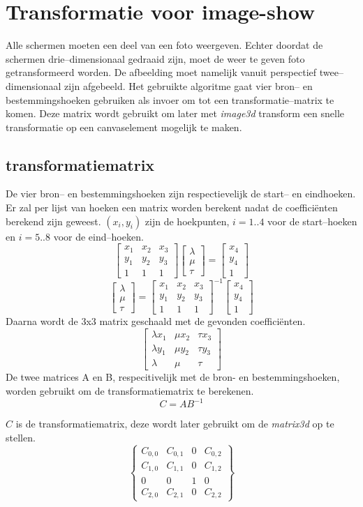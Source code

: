 \section{Transformatie voor image-show}
Alle schermen moeten een deel van een foto weergeven. Echter doordat de schermen drie--dimensionaal gedraaid zijn, moet de weer te geven foto getransformeerd worden. De afbeelding moet namelijk vanuit perspectief twee--dimensionaal zijn afgebeeld. Het gebruikte algoritme gaat vier bron-- en bestemmingshoeken gebruiken als invoer om tot een transformatie--matrix te komen. Deze matrix wordt gebruikt om later met {\it image3d} transform een snelle transformatie op een canvaselement mogelijk te maken.

\subsection{transformatiematrix}
De vier bron-- en bestemmingshoeken zijn respectievelijk de start-- en eindhoeken. Er zal per lijst van hoeken een matrix worden berekent nadat de coefficiënten berekend zijn geweest. $(x_i, y_i)$ zijn de hoekpunten, $i = 1..4$ voor de start--hoeken en $i = 5..8$ voor de eind--hoeken. \cite{redrawImageFrom3dPerspectiveTo2d}
$$ \begin{bmatrix}
x_1 & x_2 & x_3 \\ y_1 & y_2 & y_3 \\ 1 & 1 & 1
\end{bmatrix} \begin{bmatrix}
\lambda \\ \mu \\ \tau
\end{bmatrix} =
\begin{bmatrix}
x_4 \\ y_4 \\ 1
\end{bmatrix}
$$
$$ \begin{bmatrix}
\lambda \\ \mu \\ \tau
\end{bmatrix} =\begin{bmatrix}
x_1 & x_2 & x_3 \\ y_1 & y_2 & y_3 \\ 1 & 1 & 1
\end{bmatrix}^{-1}
\begin{bmatrix}
x_4 \\ y_4 \\ 1
\end{bmatrix}
$$
Daarna wordt de 3x3 matrix geschaald met de gevonden coefficiënten.
$$
\begin{bmatrix}
\lambda x_1 & \mu x_2 & \tau x_3 \\ \lambda y_1 & \mu y_2 & \tau y_3 \\ \lambda & \mu & \tau
\end{bmatrix}
$$
De twee matrices A en B, respecitivelijk met de bron- en bestemmingshoeken, worden gebruikt om de transformatiematrix te berekenen.
$$ C = AB^{-1}$$

$C$ is de transformatiematrix, deze wordt later gebruikt om de {\it matrix3d} op te stellen. \cite{projectiveTransformation}
$$
\begin{Bmatrix}
C_{0,0}	& 	C_{0,1}	&	0	&	C_{0,2} 	\\
C_{1,0}	&	C_{1,1} 	&	0	&	C_{1,2} 	\\
0		&	0		&	1	&	0		\\
C_{2,0}	&	C_{2,1}	&	0	&	C_{2,2}
\end{Bmatrix}
$$
